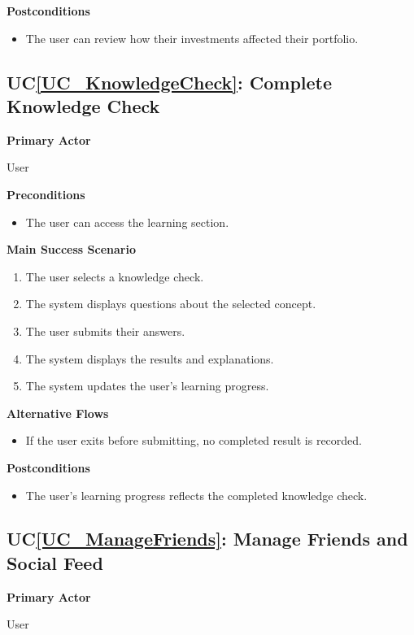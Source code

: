 \documentclass[12pt]{article}
\newcounter{ucnum} %
\newcommand{\ucref}[1]{UC\ref{#1}}
\begin{document}
\textbf{Postconditions}
\begin{itemize}
\item The user can review how their investments affected their portfolio.
\end{itemize}


\label{UC_KnowledgeCheck}
\subsection{\ucref{UC_KnowledgeCheck}: Complete Knowledge Check}

\textbf{Primary Actor}

User

\textbf{Preconditions}
\begin{itemize}
\item The user can access the learning section.
\end{itemize}

\textbf{Main Success Scenario}
\begin{enumerate}
\item The user selects a knowledge check.
\item The system displays questions about the selected concept.
\item The user submits their answers.
\item The system displays the results and explanations.
\item The system updates the user's learning progress.
\end{enumerate}

\textbf{Alternative Flows}
\begin{itemize}
\item If the user exits before submitting, no completed result is recorded.
\end{itemize}

\textbf{Postconditions}
\begin{itemize}
\item The user's learning progress reflects the completed knowledge check.
\end{itemize}


\label{UC_ManageFriends}
\subsection{\ucref{UC_ManageFriends}: Manage Friends and Social Feed}

\textbf{Primary Actor}

User
\end{document}
